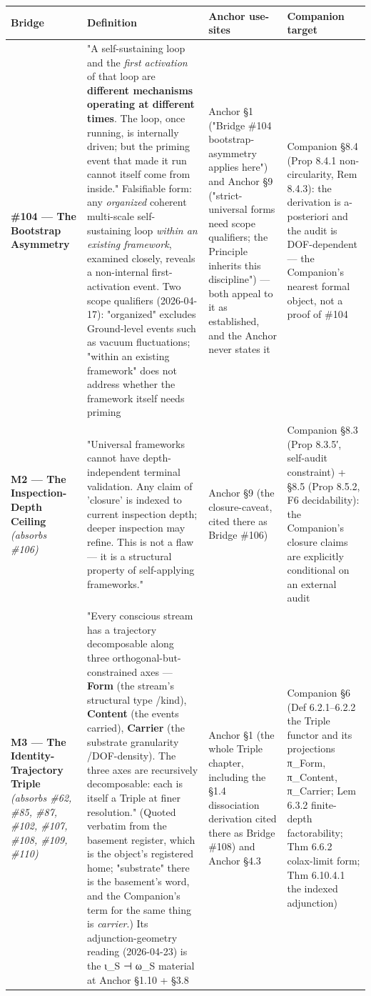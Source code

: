 \documentclass[11pt, openany]{book}
\begin{document}
\begingroup\setlength{\tabcolsep}{3pt}\renewcommand{\arraystretch}{1.15}\footnotesize
\begin{center}
\begin{tabular}{p{0.57in} p{2.18in} p{0.81in} p{0.72in}}
\toprule
Bridge & Definition & Anchor use-sites & Companion target \\
\midrule
\textbf{\#104 --- The Bootstrap Asymmetry} & "A self-sustaining loop and the \textit{first activation} of that loop are \textbf{different mechanisms operating at different times}. The loop, once running, is internally driven; but the priming event that made it run cannot itself come from inside." Falsifiable form: any \textit{organized} coherent multi-scale self-sustaining loop \textit{within an existing framework}, examined closely, reveals a non-internal first-activation event. Two scope qualifiers (2026-04-17): "organized" excludes Ground-level events such as vacuum fluctuations; "within an existing framework" does not address whether the framework itself needs priming & Anchor §1 ("Bridge \#104 bootstrap-asymmetry applies here") and Anchor §9 ("strict-universal forms need scope qualifiers; the Principle inherits this discipline") --- both appeal to it as established, and the Anchor never states it & Companion §8.4 (Prop 8.4.1 non-circularity, Rem 8.4.3): the derivation is a-posteriori and the audit is DOF-dependent --- the Companion's nearest formal object, not a proof of \#104 \\
\textbf{M2 --- The Inspection-Depth Ceiling} \textit{(absorbs \#106)} & "Universal frameworks cannot have depth-independent terminal validation. Any claim of 'closure' is indexed to current inspection depth; deeper inspection may refine. This is not a flaw --- it is a structural property of self-applying frameworks." & Anchor §9 (the closure-caveat, cited there as Bridge \#106) & Companion §8.3 (Prop 8.3.5′, self-audit constraint) + §8.5 (Prop 8.5.2, F6 decidability): the Companion's closure claims are explicitly conditional on an external audit \\
\textbf{M3 --- The Identity-Trajectory Triple} \textit{(absorbs \#62, \#85, \#87, \#102, \#107, \#108, \#109, \#110)} & "Every conscious stream has a trajectory decomposable along three orthogonal-but-constrained axes --- \textbf{Form} (the stream's structural type /\allowbreak  kind), \textbf{Content} (the events carried), \textbf{Carrier} (the substrate granularity /\allowbreak  DOF-density). The three axes are recursively decomposable: each is itself a Triple at finer resolution." (Quoted verbatim from the basement register, which is the object's registered home; "substrate" there is the basement's word, and the Companion's term for the same thing is \textit{carrier}.) Its adjunction-geometry reading (2026-04-23) is the ι\_\allowbreak{}S ⊣ ω\_\allowbreak{}S material at Anchor §1.10 + §3.8 & Anchor §1 (the whole Triple chapter, including the §1.4 dissociation derivation cited there as Bridge \#108) and Anchor §4.3 & Companion §6 (Def 6.2.1–6.2.2 the Triple functor and its projections π\_\allowbreak{}Form, π\_\allowbreak{}Content, π\_\allowbreak{}Carrier; Lem 6.3.2 finite-depth factorability; Thm 6.6.2 colax-limit form; Thm 6.10.4.1 the indexed adjunction) \\

\end{tabular}
\end{center}
\end{document}
